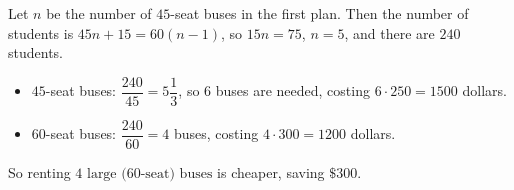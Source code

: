 Let $n$ be the number of $45$-seat buses in the first plan. Then the number of students is $45n+15=60(n-1)$, so $15n=75$, $n=5$, and there are $240$ students.
\begin{itemize}
\item $45$-seat buses: $\dfrac{240}{45}=5\dfrac13$, so $6$ buses are needed, costing $6\cdot250=1500$ dollars.
\item $60$-seat buses: $\dfrac{240}{60}=4$ buses, costing $4\cdot300=1200$ dollars.
\end{itemize}
So renting $\boxed{4\text{ large (60-seat) buses}}$ is cheaper, saving $\boxed{\$300}$.
